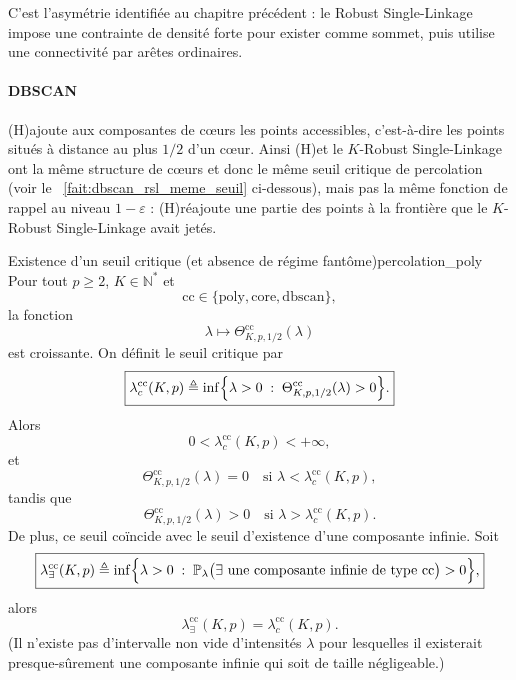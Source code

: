 C'est l'asymétrie identifiée au chapitre précédent : le Robust Single-Linkage impose une contrainte de densité forte pour exister comme sommet, puis utilise une connectivité par arêtes ordinaires.

\paragraph{DBSCAN}
(H)\DBSCAN ajoute aux composantes de cœurs les points accessibles, c'est-à-dire les points situés à distance au plus $1/2$ d'un cœur. Ainsi (H)\DBSCAN et le $K$-Robust Single-Linkage ont la même structure de cœurs et donc le même seuil critique de percolation (voir le \Fact~\ref{fait:dbscan_rsl_meme_seuil} ci-dessous), mais pas la même fonction de rappel au niveau $1-\varepsilon$ : (H)\DBSCAN réajoute une partie des points à la frontière que le $K$-Robust Single-Linkage avait jetés.

\begin{Fait}{Existence d'un seuil critique (et absence de régime fantôme)}{percolation_poly}
Pour tout $p\geq 2$, $K\in\mathbb{N}^{\ast}$ et
\[
\mathrm{cc}\in\{\mathrm{poly},\mathrm{core},\mathrm{dbscan}\},
\]
la fonction
\[
\lambda\longmapsto
\Theta^{\mathrm{cc}}_{K,p,1/2}(\lambda)
\]
est croissante. On définit le seuil critique par
\[
\boxed{
    \lambda^{\mathrm{cc}}_{c}(K,p)
    \triangleq
    \inf\Bigl\{
    \lambda>0 \;:\;
    \Theta^{\mathrm{cc}}_{K,p,1/2}(\lambda)>0
    \Bigr\}.
}
\]
Alors
\[
\boxed{
    0<\lambda^{\mathrm{cc}}_{c}(K,p)<+\infty,
}
\]
et
\[
\Theta^{\mathrm{cc}}_{K,p,1/2}(\lambda)=0
\quad\text{si }\lambda<\lambda^{\mathrm{cc}}_{c}(K,p),
\]
tandis que
\[
\Theta^{\mathrm{cc}}_{K,p,1/2}(\lambda)>0
\quad\text{si }\lambda>\lambda^{\mathrm{cc}}_{c}(K,p).
\]
De plus, ce seuil coïncide avec le seuil d'existence d'une composante
infinie. Soit
\[
\boxed{
    \lambda^{\mathrm{cc}}_{\exists}(K,p)
    \triangleq
    \inf\Bigl\{
    \lambda>0 \;:\;
    \mathbb{P}_{\lambda}\bigl(
    \exists\text{ une composante infinie de type }\mathrm{cc}
    \bigr)>0
    \Bigr\},
}
\]
alors
\[
    \lambda^{\mathrm{cc}}_{\exists}(K,p) = \lambda^{\mathrm{cc}}_{c}(K,p).
\]
(Il n'existe pas d'intervalle non vide d'intensités $\lambda$ pour lesquelles il existerait presque-sûrement une composante infinie qui soit de taille négligeable.)
\end{Fait}

